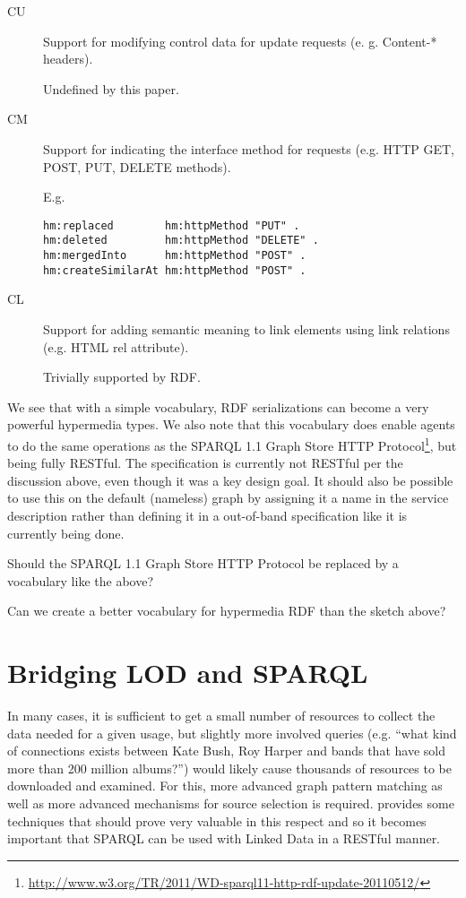 \documentclass{llncs}
\begin{document}
\begin{description}
\item[CU] Support for modifying control data for update requests
  (e. g. Content-* headers).

Undefined by this paper.

\item[CM] Support for indicating the interface method for requests
  (e.g. HTTP GET, POST, PUT, DELETE methods).

E.g.

\begin{verbatim}
hm:replaced        hm:httpMethod "PUT" .
hm:deleted         hm:httpMethod "DELETE" .
hm:mergedInto      hm:httpMethod "POST" .
hm:createSimilarAt hm:httpMethod "POST" .
\end{verbatim}

\item[CL] Support for adding semantic meaning to link elements using
  link relations (e.g. HTML rel attribute). 

Trivially supported by RDF.

\end{description}

We see that with a simple vocabulary, RDF serializations can become a
very powerful hypermedia types. We also note that this vocabulary does
enable agents to do the same operations as the SPARQL 1.1 Graph Store
HTTP
Protocol\footnote{\url{http://www.w3.org/TR/2011/WD-sparql11-http-rdf-update-20110512/}},
but being fully RESTful. The specification is currently not RESTful
per the discussion above, even though it was a key design goal. It
should also be possible to use this on the default (nameless) graph by
assigning it a name in the service description rather than defining it
in a out-of-band specification like it is currently being done.

\begin{question}
Should the SPARQL 1.1 Graph Store HTTP Protocol be replaced by a
vocabulary like the above?
\end{question}

\begin{question}
Can we create a better vocabulary for hypermedia RDF than the sketch above?
\end{question}

\section{Bridging LOD and SPARQL}

In many cases, it is sufficient to get a small number of resources to
collect the data needed for a given usage, but slightly more involved
queries (e.g. ``what kind of connections exists between Kate Bush, Roy
Harper and bands that have sold more than 200 million albums?'') would
likely cause thousands of resources to be downloaded and examined. For
this, more advanced graph pattern matching as well as more advanced
mechanisms for source selection is
required. \cite{springerlink:10.1007/978-3-642-25073-6-38} provides
some techniques that should prove very valuable in this respect and so
it becomes important that SPARQL can be used with Linked Data in a
RESTful manner.
\end{document}
